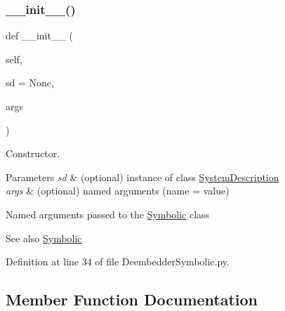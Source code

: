 \subsubsection{\texorpdfstring{\+\_\+\+\_\+init\+\_\+\+\_\+()}{\_\_init\_\_()}}
{\footnotesize\ttfamily def \+\_\+\+\_\+init\+\_\+\+\_\+ (\begin{DoxyParamCaption}\item[{}]{self,  }\item[{}]{sd = {\ttfamily None},  }\item[{}]{args }\end{DoxyParamCaption})}



Constructor. 


\begin{DoxyParams}{Parameters}
{\em sd} & (optional) instance of class \hyperlink{namespaceSignalIntegrity_1_1SystemDescriptions_1_1SystemDescription}{System\+Description} \\
\hline
{\em args} & (optional) named arguments (name = value)\\
\hline
\end{DoxyParams}
Named arguments passed to the \hyperlink{namespaceSignalIntegrity_1_1SystemDescriptions_1_1Symbolic}{Symbolic} class

\begin{DoxySeeAlso}{See also}
\hyperlink{namespaceSignalIntegrity_1_1SystemDescriptions_1_1Symbolic}{Symbolic} 
\end{DoxySeeAlso}


Definition at line 34 of file Deembedder\+Symbolic.\+py.



\subsection{Member Function Documentation}
\mbox{\label{classSignalIntegrity_1_1SystemDescriptions_1_1DeembedderSymbolic_1_1DeembedderSymbolic_a10ef812418fff67deff1540435a9698c}} 

